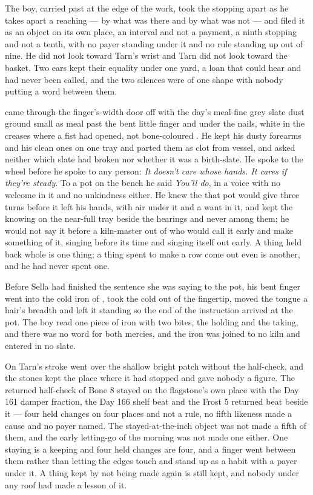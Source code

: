 The boy, carried past at the edge of the work, took the stopping apart as he takes apart a reaching --- by what was there and by what was not --- and filed it as an object on its own place, an interval and not a payment, a ninth stopping and not a tenth, with no payer standing under it and no rule standing up out of nine. He did not look toward Tarn's wrist and Tarn did not look toward the basket. Two ears kept their equality under one yard, a loan that could hear and had never been called, and the two silences were of one shape with nobody putting a word between them.

\scenebreak

 came through the finger's-width door off  with the day's meal-fine grey slate dust ground small as meal past the bent little finger and under the nails, white in the creases where a fist had opened, not bone-coloured . He kept his dusty forearms and his clean ones on one tray and parted them as clot from vessel, and asked neither which slate had broken nor whether it was a birth-slate. He spoke to the wheel before he spoke to any person: \emph{It doesn't care whose hands. It cares if they're steady}. To a pot on the bench he said \emph{You'll do}, in a voice with no welcome in it and no unkindness either. He knew the  that pot would give three turns before it left his hands, with air under it and a want in it, and kept the knowing on the near-full tray beside the hearings and never among them; he would not say it before a kiln-master out of  who would call it early and make something of it, singing before its time and singing itself out early. A thing held back whole is one thing; a thing spent to make a row come out even is another, and he had never spent one.

Before Sella had finished the sentence she was saying to the pot, his bent finger went into the cold iron of , took the cold out of the fingertip, moved the tongue a hair's breadth and left it standing so the end of the instruction arrived at the pot. The boy read one piece of iron with two bites, the holding and the taking, and there was no  word for both mercies, and the iron was joined to no kiln and entered in no slate.

On  Tarn's stroke went over the shallow bright patch without the half-check, and the stones kept the place where it had stopped and gave nobody a figure. The returned half-check of Bone 8 stayed on the flagstone's own place with the Day 161 damper fraction, the Day 166 shelf beat and the Frost 5 returned beat beside it --- four held changes on four places and not a rule, no fifth likeness made a cause and no payer named. The stayed-at-the-inch object was not made a fifth of them, and the early letting-go of the morning was not made one either. One staying is a keeping and four held changes are four, and a finger went between them rather than letting the edges touch and stand up as a habit with a payer under it. A thing kept by not being made again is still kept, and nobody under any roof had made a lesson of it.

